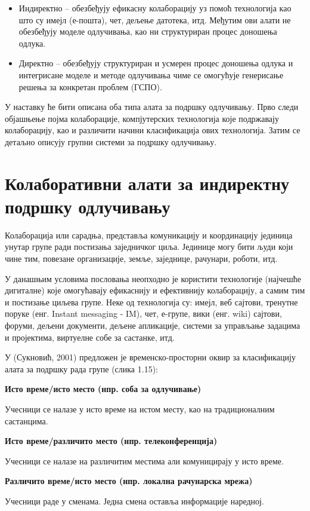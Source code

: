 \begin{itemize}
  \item Индиректно – обезбеђују ефикасну колаборацију уз помоћ технологија као што су имејл (е-пошта), чет, дељење датотека, итд. Међутим ови алати не обезбеђују моделе одлучивања, као ни структуриран процес доношења одлука.
  \item Директно – обезбеђују структуриран и усмерен процес доношења одлука и интегрисане моделе и методе одлучивања чиме се омогућује генерисање решења за конкретан проблем (ГСПО).
\end{itemize}
У наставку ће бити описана оба типа алата за подршку одлучивању. Прво следи објашњење појма колаборације, компјутерских технологија које подржавају колаборацију, као и различити начини класификација ових технологија. Затим се детаљно описују групни системи за подршку одлучивању.

\section{Колаборативни алати за индиректну подршку одлучивању}
Колаборација или сарадња, представља комуникацију и координацију јединица унутар групе ради постизања заједничког циља. Јединице могу бити људи који чине тим, повезане организације, земље, заједнице, рачунари, роботи, итд.

У данашњим условима пословања неопходно је користити технологије (најчешће дигиталне) које омогућавају ефикаснију и ефективнију колаборацију, а самим тим и постизање циљева групе. Неке од технологија су: имејл, веб сајтови, тренутне поруке (енг. Instant messaging - IM), чет, е-групе, вики (енг. wiki) сајтови, форуми, дељени документи, дељене апликације, системи за управљање задацима и пројектима, виртуелне собе за састанке, итд.

У (Сукновић, 2001) предложен је временско-просторни оквир за класификацију алата за подршку рада групе (слика 1.15):

\textbf{Исто време/исто место (нпр. соба за одлучивање)}

Учесници се налазе у исто време на истом месту, као на традиционалним састанцима.

\textbf{Исто време/различито место (нпр. телеконференција)}

Учесници се налазе на различитим местима али комуницирају у исто време.

\textbf{Различито време/исто место (нпр. локална рачунарска мрежа)}

Учесници раде у сменама. Једна смена оставља информације наредној.

